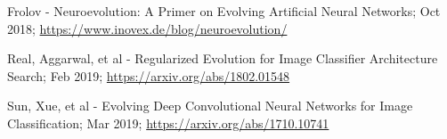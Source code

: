 \documentclass[journal, a4paper]{IEEEtran}
\begin{document}
\begin{thebibliography}{5}
    Frolov - Neuroevolution: A Primer on Evolving Artificial Neural Networks; Oct 2018;
    \url{https://www.inovex.de/blog/neuroevolution/}

    Real, Aggarwal, et al - Regularized Evolution for Image Classifier Architecture Search; Feb 2019;
    \url{https://arxiv.org/abs/1802.01548}

    Sun, Xue, et al - Evolving Deep Convolutional Neural Networks for Image Classification; Mar 2019;
    \url{https://arxiv.org/abs/1710.10741}



\end{thebibliography}
\end{document}
